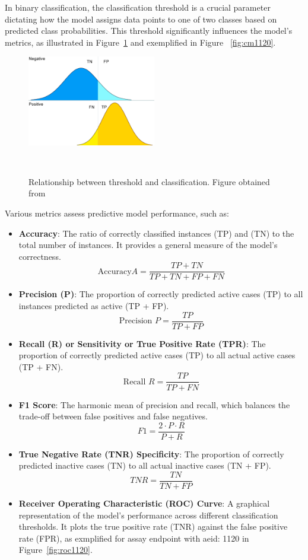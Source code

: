 In binary classification, the classification threshold is a crucial parameter dictating how the model assigns data points to one of two classes based on predicted class probabilities. This threshold significantly influences the model's metrics, as illustrated in Figure~\ref{fig:classification_threshold} and exemplified in Figure ~\ref{fig:cm1120}.
\begin{figure} 
  \centering
  \includegraphics[width=0.5\textwidth]{figures/classification_threshold.png}
  \caption{Relationship between threshold and classification. Figure obtained from~\cite{wicklin2020}}
~\label{fig:classification_threshold}
\end{figure}

Various metrics assess predictive model performance, such as:

\begin{itemize}
  \item \textbf{Accuracy}: The ratio of correctly classified instances (TP) and (TN) to the total number of instances. It provides a general measure of the model's correctness.
  \[ \text{Accuracy}  A = \frac{TP + TN}{TP + TN + FP + FN} \]

  \item \textbf{Precision (P)}: The proportion of correctly predicted active cases (TP) to all instances predicted as active (TP + FP). 
  \[ \text{Precision } P = \frac{TP}{TP + FP} \]

  \item \textbf{Recall (R) or Sensitivity or True Positive Rate (TPR)}: The proportion of correctly predicted active cases (TP) to all actual active cases (TP + FN).
  \[ \text{Recall } R = \frac{TP}{TP + FN} \]

  \item \textbf{F1 Score}: The harmonic mean of precision and recall, which balances the trade-off between false positives and false negatives.
  \[ F1 = \frac{2 \cdot P \cdot R}{P + R} \]

  \item \textbf{True Negative Rate (TNR) Specificity}: The proportion of correctly predicted inactive cases (TN) to all actual inactive cases (TN + FP).
  \[ TNR = \frac{TN}{TN + FP} \]

  \item \textbf{Receiver Operating Characteristic (ROC) Curve}: A graphical representation of the model's performance across different classification thresholds. It plots the true positive rate (TNR) against the false positive rate (FPR), as exmplified for assay endpoint with aeid: 1120 in Figure~\ref{fig:roc1120}.
\end{itemize}


